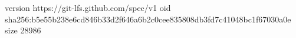 version https://git-lfs.github.com/spec/v1
oid sha256:b5e55b238e6cd846b33d2f646a6b2c0cee835808db3fd7c41048bc1f67030a0e
size 28986
